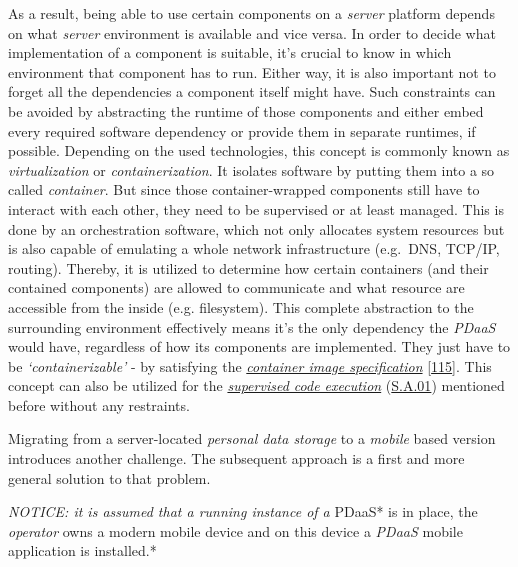 \documentclass[12pt,english,a4paper,titlepage,cleardoublepage=empty,dottedtoc]{report}
\begin{document}
As a result, being able to use certain components on a \emph{server}
platform depends on what \emph{server} environment is available and vice
versa. In order to decide what implementation of a component is
suitable, it's crucial to know in which environment that component has
to run. Either way, it is also important not to forget all the
dependencies a component itself might have. Such constraints can be
avoided by abstracting the runtime of those components and either embed
every required software dependency or provide them in separate runtimes,
if possible. Depending on the used technologies, this concept is
commonly known as \emph{virtualization} or \emph{containerization}. It
isolates software by putting them into a so called \emph{container}. But
since those container-wrapped components still have to interact with
each other, they need to be supervised or at least managed. This is done
by an orchestration software, which not only allocates system resources
but is also capable of emulating a whole network infrastructure
(e.g.~DNS, TCP/IP, routing). Thereby, it is utilized to determine how
certain containers (and their contained components) are allowed to
communicate and what resource are accessible from the inside (e.g.
filesystem). This complete abstraction to the surrounding environment
effectively means it's the only dependency the \emph{PDaaS} would have,
regardless of how its components are implemented. They just have to be
\emph{`containerizable'} - by satisfying the
\emph{\protect\hyperlink{def--container}{container image specification}}
{[}\protect\hyperlink{ref-web_oci-spec_image}{115}{]}. This concept can
also be utilized for the
\emph{\protect\hyperlink{supervised-data-access}{supervised code
execution}} (\protect\hyperlink{sa01}{S.A.01}) mentioned before without
any restraints.

Migrating from a server-located \emph{personal data storage} to a
\emph{mobile} based version introduces another challenge. The subsequent
approach is a first and more general solution to that problem.

\emph{NOTICE: it is assumed that a running instance of a }PDaaS* is in
place, the \emph{operator} owns a modern mobile device and on this
device a \emph{PDaaS} mobile application is installed.*
\end{document}
